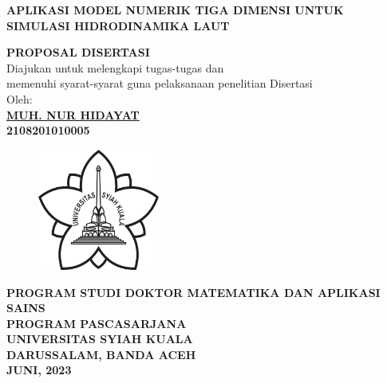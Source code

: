 \begin{spacing}{1}
	\begin{center}
		{\Large\textbf{APLIKASI MODEL NUMERIK TIGA DIMENSI UNTUK SIMULASI HIDRODINAMIKA LAUT}}\\[1.0cm]
	\end{center}
	\vspace*{0.8cm} 
	
	\begin{center}
		
		\large{\textbf{PROPOSAL DISERTASI}}
		\\\vspace*{1.8cm}    
		\normalsize{Diajukan untuk melengkapi tugas-tugas dan \\
			memenuhi syarat-syarat guna pelaksanaan penelitian Disertasi}\\[1.5cm]
		\vspace*{1cm}  
		{\large Oleh:}\\
		\vspace*{1cm}       
		\large{\textbf{\underline{MUH. NUR HIDAYAT}}}
		\\\large{\textbf{2108201010005}} 
	\end{center}\vspace*{1cm}   
	
	\begin{figure}[h]
		\centering
		\includegraphics[width=4cm]{contents/Figures/USK} %
	\end{figure}
	\vspace*{1.5cm}   
	
	\begin{center}
		\textbf{PROGRAM STUDI DOKTOR MATEMATIKA DAN APLIKASI SAINS\\
			PROGRAM PASCASARJANA \\
			UNIVERSITAS SYIAH KUALA\\
			DARUSSALAM, BANDA ACEH\\
			JUNI, 2023}
	\end{center}
	\thispagestyle{empty}
\end{spacing}